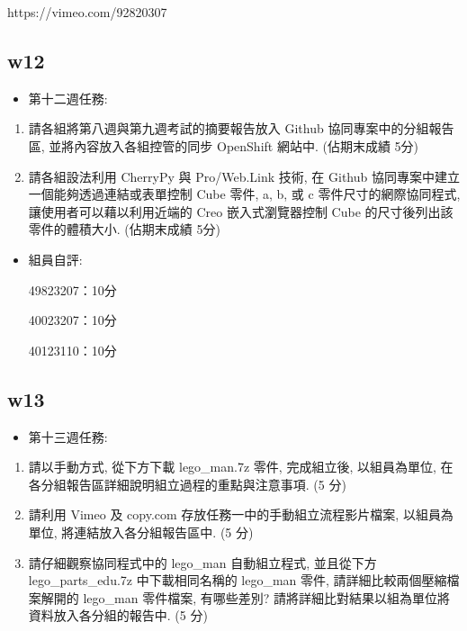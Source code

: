 \documentclass[]{article}
\begin{document}
https://vimeo.com/92820307

\subsection{w12}\label{w12-1}

\begin{itemize}
\itemsep1pt\parskip0pt
\item
  第十二週任務:
\end{itemize}

\begin{enumerate}
\def\labelenumi{\arabic{enumi}.}
\itemsep1pt\parskip0pt
\item
  請各組將第八週與第九週考試的摘要報告放入 Github
  協同專案中的分組報告區, 並將內容放入各組控管的同步 OpenShift 網站中.
  (佔期末成績 5分)
\item
  請各組設法利用 CherryPy 與 Pro/Web.Link 技術, 在 Github
  協同專案中建立一個能夠透過連結或表單控制 Cube 零件, a, b, 或 c
  零件尺寸的網際協同程式, 讓使用者可以藉以利用近端的 Creo
  嵌入式瀏覽器控制 Cube 的尺寸後列出該零件的體積大小. (佔期末成績 5分)
\end{enumerate}

\begin{itemize}
\item
  組員自評:

  49823207：10分

  40023207：10分

  40123110：10分
\end{itemize}

\subsection{w13}\label{w13-1}

\begin{itemize}
\itemsep1pt\parskip0pt
\item
  第十三週任務:
\end{itemize}

\begin{enumerate}
\def\labelenumi{\arabic{enumi}.}
\item
  請以手動方式, 從下方下載 lego\_man.7z 零件, 完成組立後, 以組員為單位,
  在各分組報告區詳細說明組立過程的重點與注意事項. (5 分)
\item
  請利用 Vimeo 及 copy.com 存放任務一中的手動組立流程影片檔案,
  以組員為單位, 將連結放入各分組報告區中. (5 分)
\item
  請仔細觀察協同程式中的 lego\_man 自動組立程式, 並且從下方
  lego\_parts\_edu.7z 中下載相同名稱的 lego\_man 零件,
  請詳細比較兩個壓縮檔案解開的 lego\_man 零件檔案, 有哪些差別?
  請將詳細比對結果以組為單位將資料放入各分組的報告中. (5 分)
\end{enumerate}
\end{document}
